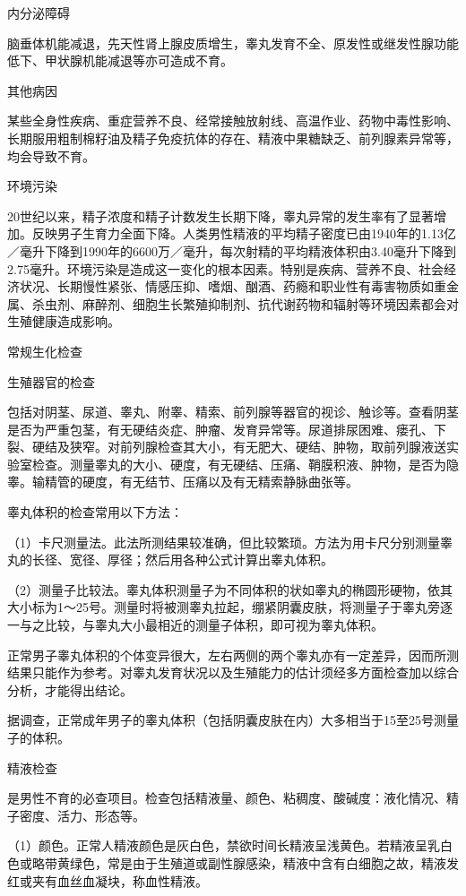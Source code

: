 \documentclass[12pt,UTF8,openany]{ctexbook}
\begin{document}
内分泌障碍

脑垂体机能减退，先天性肾上腺皮质增生，睾丸发育不全、原发性或继发性腺功能低下、甲状腺机能减退等亦可造成不育。

其他病因

某些全身性疾病、重症营养不良、经常接触放射线、高温作业、药物中毒性影响、长期服用粗制棉籽油及精子免疫抗体的存在、精液中果糖缺乏、前列腺素异常等，均会导致不育。

环境污染

20世纪以来，精子浓度和精子计数发生长期下降，睾丸异常的发生率有了显著增加。反映男子生育力全面下降。人类男性精液的平均精子密度已由1940年的1.13亿／毫升下降到1990年的6600万／毫升，每次射精的平均精液体积由3.40毫升下降到2.75毫升。环境污染是造成这一变化的根本因素。特别是疾病、营养不良、社会经济状况、长期慢性紧张、情感压抑、嗜烟、酗酒、药瘾和职业性有毒害物质如重金属、杀虫剂、麻醉剂、细胞生长繁殖抑制剂、抗代谢药物和辐射等环境因素都会对生殖健康造成影响。





常规生化检查


生殖器官的检查

包括对阴茎、尿道、睾丸、附睾、精索、前列腺等器官的视诊、触诊等。查看阴茎是否为严重包茎，有无硬结炎症、肿瘤、发育异常等。尿道排尿困难、瘘孔、下裂、硬结及狭窄。对前列腺检查其大小，有无肥大、硬结、肿物，取前列腺液送实验室检查。测量睾丸的大小、硬度，有无硬结、压痛、鞘膜积液、肿物，是否为隐睾。输精管的硬度，有无结节、压痛以及有无精索静脉曲张等。

睾丸体积的检查常用以下方法：

（1）卡尺测量法。此法所测结果较准确，但比较繁琐。方法为用卡尺分别测量睾丸的长径、宽径、厚径；然后用各种公式计算出睾丸体积。

（2）测量子比较法。睾丸体积测量子为不同体积的状如睾丸的椭圆形硬物，依其大小标为1～25号。测量时将被测睾丸拉起，绷紧阴囊皮肤，将测量子于睾丸旁逐一与之比较，与睾丸大小最相近的测量子体积，即可视为睾丸体积。

正常男子睾丸体积的个体变异很大，左右两侧的两个睾丸亦有一定差异，因而所测结果只能作为参考。对睾丸发育状况以及生殖能力的估计须经多方面检查加以综合分析，才能得出结论。

据调查，正常成年男子的睾丸体积（包括阴囊皮肤在内）大多相当于15至25号测量子的体积。

精液检查

是男性不育的必查项目。检查包括精液量、颜色、粘稠度、酸碱度：液化情况、精子密度、活力、形态等。

（1）颜色。正常人精液颜色是灰白色，禁欲时间长精液呈浅黄色。若精液呈乳白色或略带黄绿色，常是由于生殖道或副性腺感染，精液中含有白细胞之故，精液发红或夹有血丝血凝块，称血性精液。
\end{document}
